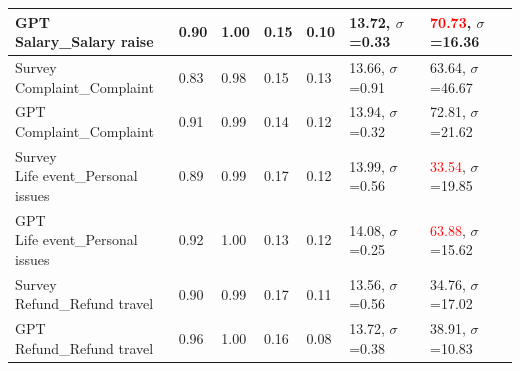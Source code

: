 \begin{table}[h]
{\begin{tabular}{|l|l|l|l|l|l|l|}
    \shortstack[l]{GPT\\Salary\_Salary raise}                                         & 0.90                          & 1.00                         & 0.15                              & 0.10                              & 13.72, $\sigma$=0.33              & \textcolor{red}{70.73}, $\sigma$=16.36    \\ \hline
    \shortstack[l]{Survey\\Complaint\_Complaint}                                      & 0.83                          & 0.98                         & 0.15                              & 0.13                              & 13.66, $\sigma$=0.91              & 63.64, $\sigma$=46.67    \\ \hline
    \shortstack[l]{GPT\\Complaint\_Complaint}                                         & 0.91                          & 0.99                         & 0.14                              & 0.12                              & 13.94, $\sigma$=0.32              & 72.81, $\sigma$=21.62    \\ \hline
    \shortstack[l]{Survey\\Life event\_Personal issues}                               & 0.89                          & 0.99                         & 0.17                              & 0.12                              & 13.99, $\sigma$=0.56              & \textcolor{red}{33.54}, $\sigma$=19.85    \\ \hline
    \shortstack[l]{GPT\\Life event\_Personal issues}                                  & 0.92                          & 1.00                         & 0.13                              & 0.12                              & 14.08, $\sigma$=0.25              & \textcolor{red}{63.88}, $\sigma$=15.62    \\ \hline
    \shortstack[l]{Survey\\Refund\_Refund travel}                                     & 0.90                          & 0.99                         & 0.17                              & 0.11                              & 13.56, $\sigma$=0.56              & 34.76, $\sigma$=17.02    \\ \hline
    \shortstack[l]{GPT\\Refund\_Refund travel}                                        & 0.96                          & 1.00                         & 0.16                              & 0.08                              & 13.72, $\sigma$=0.38              & 38.91, $\sigma$=10.83    \\ \hline

\end{tabular}}
\end{table}
